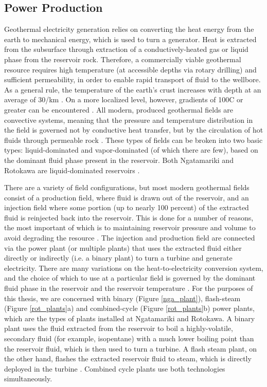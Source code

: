 \subsection{Power Production}
Geothermal electricity generation relies on converting the heat energy from the earth to mechanical energy, which is used to turn a generator. Heat is extracted from the subsurface through extraction of a conductively-heated gas or liquid phase from the reservoir rock. Therefore, a commercially viable geothermal resource requires high temperature (at accessible depths via rotary drilling) and sufficient \gls{permeability}, in order to enable rapid transport of fluid to the wellbore. As a general rule, the temperature of the earth's crust increases with depth at an average of 30\slash{km} \citep{Grant_2011}. On a more localized level, however, gradients of 100\textdegree C or greater can be encountered \citep{Grant_2011}. All modern, produced geothermal fields are convective systems, meaning that the pressure and temperature distribution in the field is governed not by conductive heat transfer, but by the circulation of hot fluids through permeable rock \citep{Grant_2011}. These types of fields can be broken into two basic types: liquid-dominated and vapor-dominated (of which there are few), based on the dominant fluid phase present in the reservoir. Both Ngatamariki and Rotokawa are liquid-dominated reservoirs \citep{McNamara_2016,Chambefort_2016}.

There are a variety of field configurations, but most modern geothermal fields consist of a production field, where fluid is drawn out of the reservoir, and an injection field where some portion (up to nearly 100 percent) of the extracted fluid is reinjected back into the reservoir. This is done for a number of reasons, the most important of which is to maintaining reservoir pressure and volume to avoid degrading the resource \citep{Grant_2011}. The injection and production field are connected via the power plant (or multiple plants) that uses the extracted fluid either directly or indirectly (i.e. a binary plant) to turn a turbine and generate electricity. There are many variations on the heat-to-electricity conversion system, and the choice of which to use at a particular field is governed by the dominant fluid phase in the reservoir and the reservoir temperature \citep{DiPippo_2016}. For the purposes of this thesis, we are concerned with binary (Figure \ref{nga_plant}), flash-steam (Figure \ref{rot_plants}a) and combined-cycle (Figure \ref{rot_plants}b) power plants, which are the types of plants installed at Ngatamariki and Rotokawa. A binary plant uses the fluid extracted from the reservoir to boil a highly-volatile, secondary fluid (for example, isopentane) with a much lower boiling point than the reservoir fluid, which is then used to turn a turbine. A flash steam plant, on the other hand, flashes the extracted reservoir fluid to steam, which is directly deployed in the turbine \citep{DiPippo_2016}. Combined cycle plants use both technologies simultaneously.

